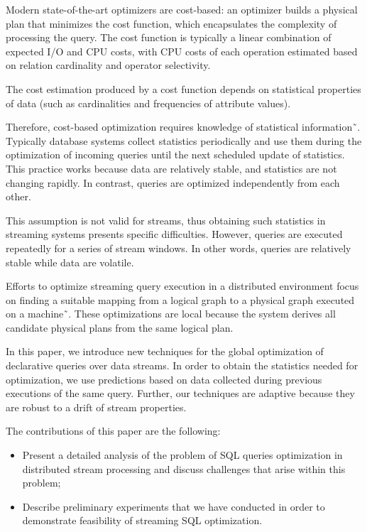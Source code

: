 Modern state-of-the-art optimizers are cost-based: an optimizer builds a physical plan that minimizes the cost function, which encapsulates the complexity of processing the query. 
The cost function is typically a linear combination of expected I/O and CPU costs, with CPU costs of each operation estimated based on relation cardinality and operator selectivity. 

The cost estimation produced by a cost function depends on statistical properties of data (such as cardinalities and frequencies of attribute values). 

Therefore, cost-based optimization requires knowledge of statistical information˜\cite{Neumann2018optimization}.  
Typically database systems collect statistics periodically and use them during the optimization of incoming queries until the next scheduled update of statistics. 
This practice works because data are relatively stable, and statistics are not changing rapidly. In contrast, queries are optimized independently from each other. 

This assumption is not valid for streams, thus obtaining such statistics in streaming systems presents specific difficulties. However, queries are executed repeatedly for a series of stream windows. In other words, queries are relatively stable while data are volatile.

Efforts to optimize streaming query execution in a distributed environment focus on finding a suitable mapping from a logical graph to a physical graph executed on a machine˜\cite{grulich2020grizzly, gedik2009code, kroll2019arc, schneider2012auto, gedik2008spade}.
These optimizations are local because the system derives all candidate physical plans from the same logical plan.  

In this paper, we introduce new techniques for the global optimization of declarative queries over data streams. 
In order to obtain the statistics needed for optimization, we use predictions based on data collected during previous executions of the same query. 
Further, our techniques are adaptive because they are robust to a drift of stream properties. 

The  contributions of this paper are the following:
\begin{itemize}
    \item Present a detailed analysis of the problem of SQL queries optimization in distributed stream processing and discuss challenges that arise within this problem;
    \item Describe preliminary experiments that we have conducted in order to demonstrate feasibility of streaming SQL optimization.
\end{itemize}


